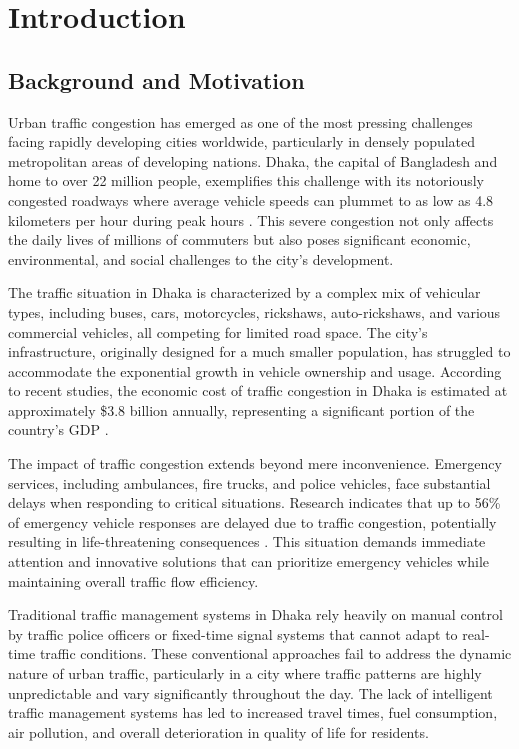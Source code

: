 \chapter{Introduction}
\label{ch:introduction}

\section{Background and Motivation}

Urban traffic congestion has emerged as one of the most pressing challenges facing rapidly developing cities worldwide, particularly in densely populated metropolitan areas of developing nations. Dhaka, the capital of Bangladesh and home to over 22 million people, exemplifies this challenge with its notoriously congested roadways where average vehicle speeds can plummet to as low as 4.8 kilometers per hour during peak hours \cite{mustafa2023dhaka}. This severe congestion not only affects the daily lives of millions of commuters but also poses significant economic, environmental, and social challenges to the city's development.

The traffic situation in Dhaka is characterized by a complex mix of vehicular types, including buses, cars, motorcycles, rickshaws, auto-rickshaws, and various commercial vehicles, all competing for limited road space. The city's infrastructure, originally designed for a much smaller population, has struggled to accommodate the exponential growth in vehicle ownership and usage. According to recent studies, the economic cost of traffic congestion in Dhaka is estimated at approximately \$3.8 billion annually, representing a significant portion of the country's GDP \cite{karim2022traffic}.

The impact of traffic congestion extends beyond mere inconvenience. Emergency services, including ambulances, fire trucks, and police vehicles, face substantial delays when responding to critical situations. Research indicates that up to 56\% of emergency vehicle responses are delayed due to traffic congestion, potentially resulting in life-threatening consequences \cite{wu2014emergency}. This situation demands immediate attention and innovative solutions that can prioritize emergency vehicles while maintaining overall traffic flow efficiency.

Traditional traffic management systems in Dhaka rely heavily on manual control by traffic police officers or fixed-time signal systems that cannot adapt to real-time traffic conditions. These conventional approaches fail to address the dynamic nature of urban traffic, particularly in a city where traffic patterns are highly unpredictable and vary significantly throughout the day. The lack of intelligent traffic management systems has led to increased travel times, fuel consumption, air pollution, and overall deterioration in quality of life for residents.

